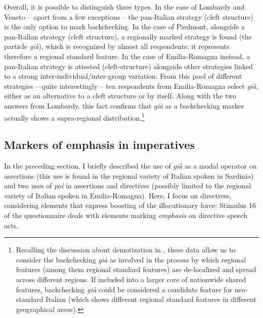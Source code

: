 Overall, it is possible to distinguish three types. In the case of Lombardy and Veneto – apart from a few exceptions – the pan-Italian strategy (cleft structure) is the only option to mark backchecking. In the case of Piedmont, alongside a pan-Italian strategy (cleft structure), a regionally marked strategy is found (the particle \textit{già}), which is recognized by almost all respondents: it represents therefore a regional standard feature. In the case of Emilia-Romagna instead, a pan-Italian strategy is attested (cleft-structure) alongside other strategies linked to a strong inter-individual/inter-group variation. From this pool of different strategies – quite interestingly – ten respondents from Emilia-Romagna select \textit{già}, either as an alternative to a cleft structure or by itself. Along with the two answers from Lombardy, this fact confirms that \textit{già} as a backchecking marker actually shows a supra-regional distribution.\footnote{Recalling the discussion about demotization in , these data allow us to consider the backchecking \textit{già} as involved in the process by which regional features (among them regional standard features) are de-localized and spread across different regions. If included into a larger core of nationwide shared features, backchecking \textit{già} could be considered a candidate feature for neo-standard Italian (which shows different regional standard features in different geographical areas).}

\subsection{Markers of emphasis in imperatives}
\hypertarget{Toc124860688}{}
In the preceding section, I briefly described the use of \textit{già} as a modal operator on assertions (this use is found in the regional variety of Italian spoken in Sardinia) and two uses of \textit{poi} in assertions and directives (possibly limited to the regional variety of Italian spoken in Emilia-Romagna). Here, I focus on directives, considering elements that express boosting of the illocutionary force: Stimulus 16 of the questionnaire deals with elements marking \textit{emphasis} on directive speech acts.

